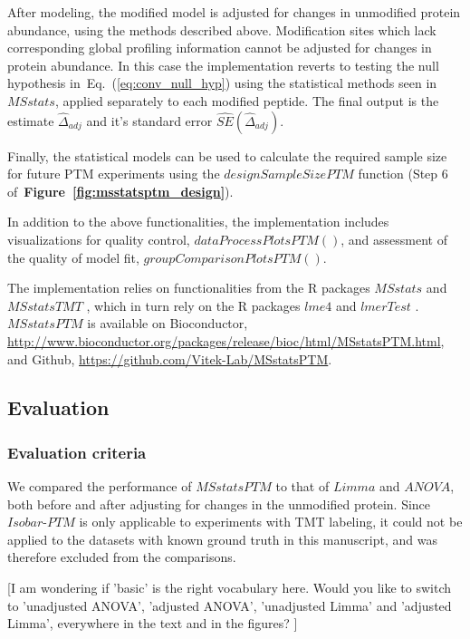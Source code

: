\documentclass[mcp]{article}
\numberwithin{table}{section}
\def\todo#1{{\color{red}[#1]}}
\def\eqref#1{Eq.~(\ref{eq:#1})}
\def\figref#1{{\bf Figure~\ref{fig:#1}}}
\begin{document}
After modeling, the modified model is adjusted for changes in unmodified protein abundance, using the methods described above. Modification sites which lack corresponding global profiling information cannot be adjusted for changes in protein abundance. In this case the implementation reverts to testing the null hypothesis in~\eqref{conv_null_hyp} using the statistical methods seen in $MSstats$, applied separately to each modified peptide. The final output is the estimate $\hat{\Delta}_{adj}$ and it's standard error $\widehat{SE}(\hat{\Delta}_{adj})$.

Finally, the statistical models can be used to calculate the required sample size for future PTM experiments using the $designSampleSizePTM$ function (Step 6 of~\figref{msstatsptm_design}).

In addition to the above functionalities, the implementation includes visualizations for quality control, $dataProcessPlotsPTM()$, and assessment of the quality of model fit, $groupComparisonPlotsPTM()$.

The implementation relies on functionalities from the R packages $MSstats$ \cite{Choi:2014} and $MSstatsTMT$ \cite{Huang:2020}, which in turn rely on the R packages $lme4$ \cite{Bates2015} and $lmerTest$ \cite{Kuznetsova2017}. $MSstatsPTM$ is available on Bioconductor, \url{http://www.bioconductor.org/packages/release/bioc/html/MSstatsPTM.html}, and Github, \url{https://github.com/Vitek-Lab/MSstatsPTM}.

\subsection*{Evaluation}

\subsubsection*{Evaluation criteria}

We compared the performance of $MSstatsPTM$ to that of $Limma$ and $ANOVA$, both before and after adjusting for changes in the unmodified protein. Since $Isobar$-$PTM$ is only applicable to experiments with TMT labeling, it could not be applied to the datasets with known ground truth in this manuscript, and was therefore excluded from the comparisons. 

\todo{I am wondering if 'basic' is the right vocabulary here. Would you like to switch to 'unadjusted ANOVA', 'adjusted ANOVA', 'unadjusted Limma' and 'adjusted Limma', everywhere in the text and in the figures? }
\end{document}
